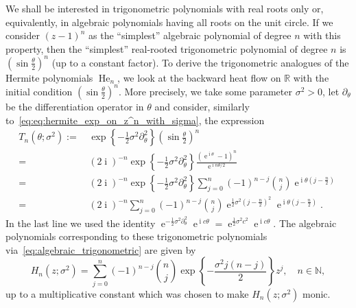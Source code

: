 \documentclass[10pt]{amsart}
\theoremstyle{definition}\newtheorem{defi}[theo]{Definition}\newtheorem{rema}[theo]{Remark}\newtheorem{exam}[theo]{Example}\newtheorem{exem}[theo]{Example}\newtheorem{nota}[theo]{Notation}
\DeclareMathOperator*{\He}{He}
\DeclareMathOperator{\eee}{e}
\DeclareMathOperator{\ii}{i}
\newcommand{\R}{\mathbb{R}}
\newcommand{\N}{\mathbb{N}}
\begin{document}
We shall be interested in trigonometric polynomials with real roots only or, equivalently, in algebraic polynomials having all roots on the unit circle. If we consider $(z-1)^n$ as the ``simplest'' algebraic polynomial of degree $n$ with this property, then the ``simplest'' real-rooted trigonometric polynomial of degree $n$ is $(\sin \frac \theta 2)^{n}$ (up to a constant factor). To derive the trigonometric analogues of the Hermite polynomials $\He_n$, we look at the backward heat flow on $\R$ with the initial condition $(\sin \frac \theta 2)^{n}$. More precisely, we take some parameter $\sigma^2>0$, let $\partial_\theta$ be the differentiation operator in $\theta$ and consider, similarly to~\eqref{eq:eq:hermite_exp_on_z^n_with_sigma}, the expression
\begin{equation}\label{eq:exp_diff_sin_theta_power}
\begin{split}
T_n(\theta; \sigma^2) {:=}&\, \exp\left\{-\frac{1}{2}\sigma^2 \partial_\theta^2\right\} \left(\sin \frac \theta 2\right)^{n}\\
=&\,(2\ii)^{-n} \exp\left\{-\frac{1}{2}\sigma^2 \partial_\theta^2\right\} \frac{(\eee^{\ii \theta} - 1)^n}{\eee^{\ii n \theta/2}}\\
=&\,(2\ii)^{-n} \exp\left\{-\frac{1}{2}\sigma^2 \partial_\theta^2\right\}\sum_{j=0}^n (-1)^{n-j} \binom nj \eee^{\ii \theta \left(j - \frac n2\right)}\\
=&\,(2\ii)^{-n} \sum_{j=0}^n (-1)^{n-j} \binom nj \eee^{\frac 12 \sigma^2 \left(j-\frac n2\right)^2} \eee^{\ii \theta \left(j - \frac n2\right)}.
\end{split}
\end{equation}
In the last line we used the identity $\eee^{-\frac 12 \sigma^2 \partial_\theta^2} \eee^{\ii c \theta} = \eee^{\frac 12 \sigma^2 c^2} \eee^{\ii c \theta}$. The algebraic polynomials corresponding to these trigonometric polynomials via~\eqref{eq:algebraic_trigonometric} are given by
\begin{equation}\label{eq:hermite_poly_circ_def1}
H_n(z;\sigma^2) =
\sum_{j=0}^n (-1)^{n-j} \binom nj \exp\left\{ - \frac {\sigma^2 j (n-j)}{2}\right\} z^j,
\quad n\in \N,
\end{equation}
up to a multiplicative constant which was chosen to make $H_n(z;\sigma^2)$ monic.
\end{document}

